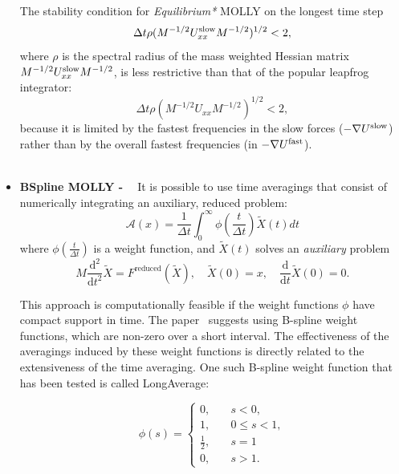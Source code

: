\documentclass[11pt]{report}
\begin{document}
\begin{appendix}
\begin{itemize}
The stability condition for {\em
Equilibrium*} MOLLY on the longest time step 
\begin{equation}
\Delta t\rho(M^{-1/2}U_{xx}^{{\rm slow}}M^{-1/2})^{1/2}<2,
\end{equation}
where $\rho$ is the spectral radius of the mass weighted Hessian
matrix $M^{-1/2}U_{xx}^{{\rm slow}}M^{-1/2}$, is less restrictive than
that of the popular leapfrog integrator:
\begin{equation}
\Delta t\rho(M^{-1/2}U_{xx}M^{-1/2})^{1/2}<2,
\end{equation}
because it is limited by the
fastest frequencies in the slow forces ($-\nabla U^{{\rm slow}}$)
rather than by the overall fastest frequencies (in $-\nabla U^{{\rm
fast}}$).
\\ \\

\item {\bf BSpline MOLLY - ~\cite{IZAG98}} 
It is possible to use time averagings that consist of numerically integrating
an auxiliary, reduced problem:
\begin{equation}
\mathcal{A}(x)=\frac{1}{\Delta t}\int_{0}^{\infty}\phi\left(  \frac{t}{\Delta
t}\right)  \tilde{X}(t)dt \label{eq:weightave}
\end{equation}
where $\phi\left(  \frac{t}{\Delta t}\right)  $
 is a weight function, and $\tilde{X}(t)$
 solves an \emph{auxiliary} problem
        \begin{equation}
M\frac{\mathrm{d}^{2}}{\mathrm{d}t^{2}}\tilde{X}=F^{\mathrm{reduced}}
(\tilde{X}),\quad\tilde{X}(0)=x,\quad\frac{\mathrm{d}}{\mathrm{d}t}\tilde
{X}(0)=0. \label{eq:reducedflow}
\end{equation}

This approach is computationally feasible if the weight functions
$\phi$ have compact support in time. The paper~\cite{GaSS98b} suggests
using B-spline weight functions, which are non-zero over a short
interval. The effectiveness of the averagings induced by these weight
functions is directly related to the extensiveness of the time
averaging. One such B-spline weight function that has been tested is
called LongAverage:

\begin{equation}
\phi(s) = \begin{cases}
        0, & \quad s < 0,       \\
        1, & \quad 0 \leq s < 1,\\
        \frac{1}{2}, & \quad s = 1 \\
        0, & \quad s > 1.
        \end{cases}
\label{eq:bspline00}
\end{equation}


\end{itemize}
\end{appendix}
\end{document}
